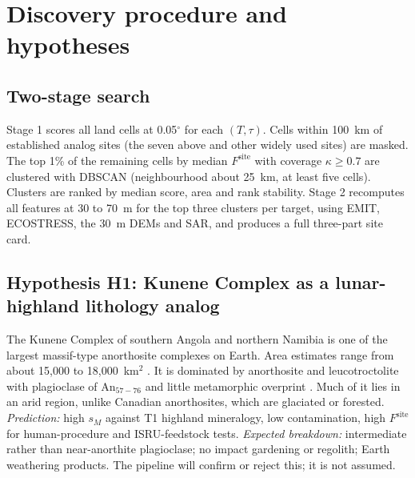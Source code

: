 \documentclass[11pt,a4paper]{article}
\begin{document}
\section{Discovery procedure and hypotheses}

\subsection{Two-stage search}
Stage 1 scores all land cells at 0.05$^\circ$ for each $(T,\tau)$. Cells within 100~km of established analog sites (the seven above and other widely used sites) are masked. The top 1\% of the remaining cells by median $F^{\mathrm{site}}$ with coverage $\kappa\ge0.7$ are clustered with DBSCAN \citep{ester1996} (neighbourhood about 25~km, at least five cells). Clusters are ranked by median score, area and rank stability. Stage 2 recomputes all features at 30 to 70~m for the top three clusters per target, using EMIT, ECOSTRESS, the 30~m DEMs and SAR, and produces a full three-part site card.

\subsection{Hypothesis H1: Kunene Complex as a lunar-highland lithology analog}
The Kunene Complex of southern Angola and northern Namibia is one of the largest massif-type anorthosite complexes on Earth. Area estimates range from about 15{,}000 to 18{,}000~km$^2$ \citep{ashwal1994,druppel2007}. It is dominated by anorthosite and leucotroctolite with plagioclase of An$_{57-76}$ and little metamorphic overprint \citep{ashwal1994}. Much of it lies in an arid region, unlike Canadian anorthosites, which are glaciated or forested. \emph{Prediction:} high $s_M$ against T1 highland mineralogy, low contamination, high $F^{\mathrm{site}}$ for human-procedure and ISRU-feedstock tests. \emph{Expected breakdown:} intermediate rather than near-anorthite plagioclase; no impact gardening or regolith; Earth weathering products. The pipeline will confirm or reject this; it is not assumed.
\end{document}
